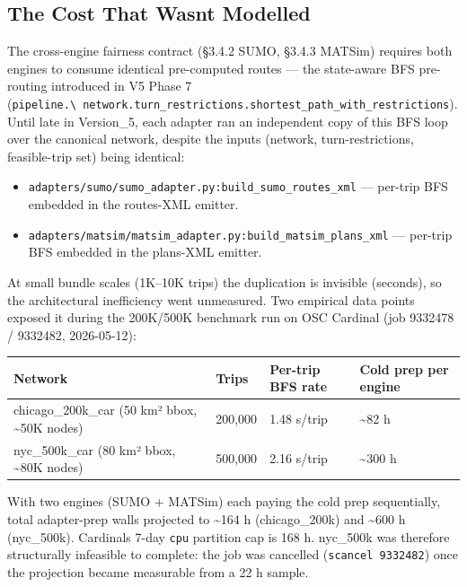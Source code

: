 \subsection{The Cost That Wasn\textquotesingle t
Modelled}\label{381-the-cost-that-wasnt-modelled}

The cross-engine fairness contract (§3.4.2 SUMO, §3.4.3 MATSim) requires
both engines to consume identical pre-computed routes --- the
state-aware BFS pre-routing introduced in V5 Phase 7
(\texttt{pipeline.\textbackslash{}\ network.turn\_restrictions.shortest\_path\_with\_restrictions}).
Until late in Version\_5, each adapter ran an independent copy of this
BFS loop over the canonical network, despite the inputs (network,
turn-restrictions, feasible-trip set) being identical:

\begin{itemize}
\tightlist
\item
  \texttt{adapters/sumo/sumo\_adapter.py:build\_sumo\_routes\_xml} ---
  per-trip BFS embedded in the routes-XML emitter.
\item
  \texttt{adapters/matsim/matsim\_adapter.py:build\_matsim\_plans\_xml}
  --- per-trip BFS embedded in the plans-XML emitter.
\end{itemize}

At small bundle scales (1K--10K trips) the duplication is invisible
(seconds), so the architectural inefficiency went unmeasured. Two
empirical data points exposed it during the 200K/500K benchmark run on
OSC Cardinal (job 9332478 / 9332482, 2026-05-12):

\begin{longtable}[]{@{}llll@{}}
\toprule\noalign{}
Network & Trips & Per-trip BFS rate & Cold prep per engine \\
\midrule\noalign{}
\endhead
\bottomrule\noalign{}
\endlastfoot
chicago\_200k\_car (50 km² bbox, \textasciitilde50K nodes) & 200,000 &
1.48 s/trip & \textasciitilde82 h \\
nyc\_500k\_car (80 km² bbox, \textasciitilde80K nodes) & 500,000 & 2.16
s/trip & \textasciitilde300 h \\
\end{longtable}

With two engines (SUMO + MATSim) each paying the cold prep sequentially,
total adapter-prep walls projected to \textasciitilde164 h
(chicago\_200k) and \textasciitilde600 h (nyc\_500k).
Cardinal\textquotesingle s 7-day \texttt{cpu} partition cap is 168 h.
nyc\_500k was therefore structurally infeasible to complete: the job was
cancelled (\texttt{scancel\ 9332482}) once the projection became
measurable from a 22 h sample.

